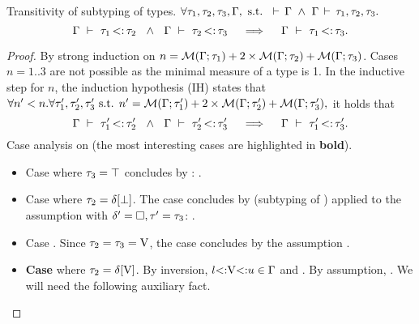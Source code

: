 \begin{theorem}{Transitivity of subtyping of types.}\label{thm:sub-ty-trans}
    $\forall \tau_1, \tau_2, \tau_3, \Gamma, \text{ s.t. }
    \,\vdash\,\Gamma\ \land\ \Gamma\,\vdash\,\tau_1, \tau_2, \tau_3.$
    \[
        \subtydflt{\ty_1}{\ty_2} \ \ \land\ \  \subtydflt{\ty_2}{\ty_3}
        \quad\implies\quad
        \subtydflt{\ty_1}{\ty_3}.
    \]
\end{theorem}
\begin{proof}
    By strong induction on
    $n = \operatorname{\mathcal{M}}(\Gamma;\tau_1) + 2\times\operatorname{\mathcal{M}}(\Gamma;\tau_2) + \operatorname{\mathcal{M}}(\Gamma;\tau_3)$.
    Cases $n = 1..3$ are not possible as the minimal measure of a type is 1.
    In the inductive step for $n$, the induction hypothesis (IH) states that
    $\forall n'<n. \forall \tau'_1, \tau'_2, \tau'_3 \text{ s.t. }
    n' = \operatorname{\mathcal{M}}(\Gamma;\tau'_1) + 2\times\operatorname{\mathcal{M}}(\Gamma;\tau'_2) + \operatorname{\mathcal{M}}(\Gamma;\tau'_3),$
    it holds that
    \[
        \subtydflt{\ty'_1}{\ty'_2} \ \ \land\ \  \subtydflt{\ty'_2}{\ty'_3}
        \quad\implies\quad
        \subtydflt{\ty'_1}{\ty'_3}.
    \]
    Case analysis on  (the most interesting cases are
    highlighted in \textbf{bold}).
    \begin{itemize}
        \item Case   where $\tau_3 = \top$
            concludes by : .
        \item Case  
            where $\tau_2=\delta[\bot]$.
            The case concludes by 
            (subtyping of \tybot) applied
            to the assumption 
            with $\delta' = \square, \tau' = \tau_3$:
            .
        \item Case  \subtydflt{\vany}{\vany}.
            Since $\tau_2=\tau_3=\mathrm{V}$, the case concludes by the assumption
            .
        \item \textbf{Case }  
            where $\tau_2 = \delta[\mathrm{V}]$.
            By inversion, $l{\operatorname{<:}}\mathrm{V}{\operatorname{<:}}u \in \Gamma$ and
            .
            By assumption, .
            We will need the following auxiliary fact.


\end{itemize}
\end{proof}
